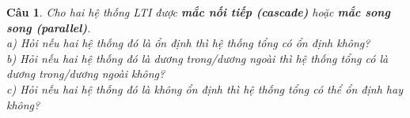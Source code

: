 \documentclass[11pt]{article}
\newtheorem{bt}{Câu}
\begin{document}
\begin{bt}
Cho hai hệ thống LTI được \textbf{mắc nối tiếp (cascade)} hoặc \textbf{mắc song song (parallel)}. \\
a) Hỏi nếu hai hệ thống đó là ổn định thì hệ thống tổng có ổn định không? \\
b) Hỏi nếu hai hệ thống đó là dương trong/dương ngoài thì hệ thống tổng có là dương trong/dương ngoài không? \\
c) Hỏi nếu hai hệ thống đó là không ổn định thì hệ thống tổng có thể ổn định hay không?
\end{bt}
\end{document}
